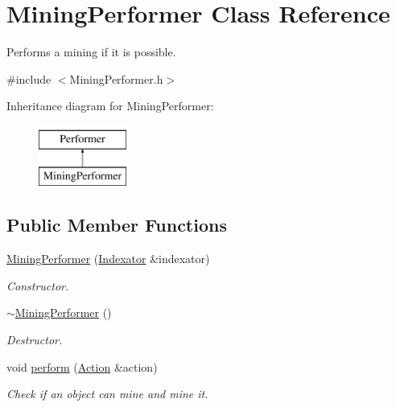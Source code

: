 \hypertarget{classMiningPerformer}{\section{Mining\-Performer Class Reference}
\label{classMiningPerformer}
}


Performs a mining if it is possible.  




{\ttfamily \#include $<$Mining\-Performer.\-h$>$}

Inheritance diagram for Mining\-Performer\-:\begin{figure}[H]
\begin{center}
\leavevmode
\includegraphics[height=2.000000cm]{classMiningPerformer}
\end{center}
\end{figure}
\subsection*{Public Member Functions}
\begin{DoxyCompactItemize}
\item 
\hyperlink{classMiningPerformer_a479529b5ff8ada471ad4185ac5b8fd5e}{Mining\-Performer} (\hyperlink{classIndexator}{Indexator} \&indexator)
\begin{DoxyCompactList}\small\item\em Constructor. \end{DoxyCompactList}\item 
\hyperlink{classMiningPerformer_a9855d33e82be8f645d9c54b47f5fdad7}{$\sim$\-Mining\-Performer} ()
\begin{DoxyCompactList}\small\item\em Destructor. \end{DoxyCompactList}\item 
void \hyperlink{classMiningPerformer_abfc1f91322ab3dd52af98a4cb6e3f30b}{perform} (\hyperlink{classAction}{Action} \&action)
\begin{DoxyCompactList}\small\item\em Check if an object can mine and mine it. \end{DoxyCompactList}\end{DoxyCompactItemize}


